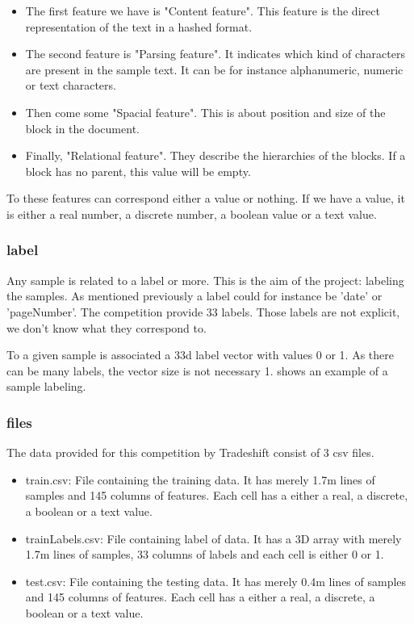 			\begin{itemize}
				\item The first feature we have is "Content feature". This feature is the direct representation of the text in a hashed format.
				\item The second feature is "Parsing feature". It indicates which kind of characters are present in the sample text. It can be for instance alphanumeric, numeric or text characters.
				\item Then come some "Spacial feature". This is about position and size of the block in the document.
			 	\item Finally, "Relational feature". They describe the hierarchies of the blocks. If a block has no parent, this value will be empty.
			\end{itemize}

			To these features can correspond either a value or nothing. If we have a value, it is either a real number, a discrete number, a boolean value or a text value. 


		\subsubsection{label}
			Any sample is related to a label or more. This is the aim of the project: labeling the samples. As mentioned previously a label could for instance be 'date' or 'pageNumber'. The competition provide 33 labels. Those labels are not explicit, we don't know what they correspond to.

			To a given sample is associated a 33d label vector with values 0 or 1. As there can be many labels, the vector size is not necessary 1.  shows an example of a sample labeling.


		\subsubsection{files}
			The data provided for this competition by Tradeshift consist of 3 csv files. 

			\begin{itemize}
				\item train.csv: File containing the training data. It has merely 1.7m lines of samples and 145 columns of features. Each cell has a either a real, a discrete, a boolean or a text value.
				\item trainLabels.csv: File containing label of data. It has a 3D array with merely 1.7m lines of samples, 33 columns of labels and each cell is either 0 or 1.
				\item test.csv: File containing the testing data. It has merely 0.4m lines of samples and 145 columns of features. Each cell has a either a real, a discrete, a boolean or a text value.
			\end{itemize}



